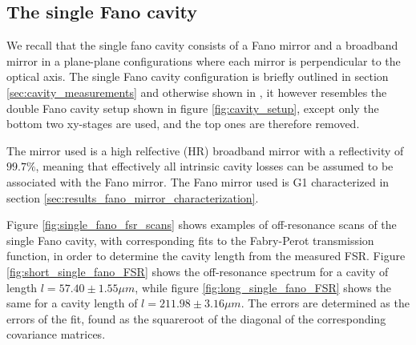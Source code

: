 \clearpage
\subsection{The single Fano cavity}\label{sec:the_single_fano_cavity_results}

We recall that the single fano cavity consists of a Fano mirror and a broadband mirror in a plane-plane configurations where each mirror is perpendicular to the optical axis. The single Fano cavity configuration is briefly outlined in section \ref{sec:cavity_measurements} and otherwise shown in \cite{Mitra}, it however resembles the double Fano cavity setup shown in figure \ref{fig:cavity_setup}, except only the bottom two xy-stages are used, and the top ones are therefore removed.   

The mirror used is a high relfective (HR) broadband mirror with a reflectivity of $99.7\%$, meaning that effectively all intrinsic cavity losses can be assumed to be associated with the Fano mirror. The Fano mirror used is G1 characterized in section \ref{sec:results_fano_mirror_characterization}. 

Figure \ref{fig:single_fano_fsr_scans} shows examples of off-resonance scans of the single Fano cavity, with corresponding fits to the Fabry-Perot transmission function, in order to determine the cavity length from the measured FSR. Figure \ref{fig:short_single_fano_FSR} shows the off-resonance spectrum for a cavity of length $l = 57.40 \pm 1.55 \mu m$, while figure \ref{fig:long_single_fano_FSR} shows the same for a cavity length of $l = 211.98 \pm 3.16 \mu m$. The errors are determined as the errors of the fit, found as the squareroot of the diagonal of the corresponding covariance matrices.

